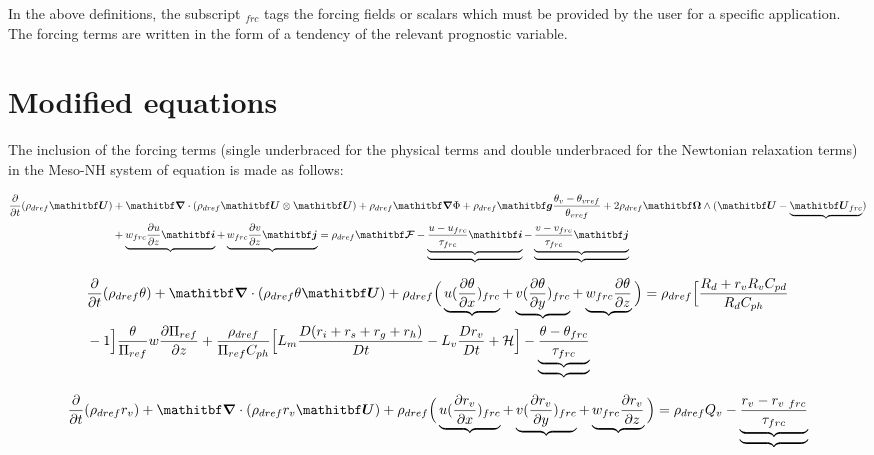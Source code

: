 In the above definitions, the subscript $_{frc}$ tags the forcing fields or scalars
which must be provided by the user for a specific application. The forcing terms
are written in the form of a tendency of the relevant prognostic variable.

\section{Modified equations}
The inclusion of the forcing terms (single underbraced for the physical
terms and double underbraced for the Newtonian relaxation terms) in the
Meso-NH system of equation is made as follows:

\bigskip
{}
\begin{eqnarray}
{\partial \over \partial t} (\rho_{dref} \vec U) & +
\vec \nabla \cdot (\rho_{dref} \vec U\otimes \vec U) + \rho_{dref} \vec \nabla \Phi + \rho_{dref} \vec g \dfrac{\theta_v - \theta_{vref}}{\theta_{vref}}+
2\rho_{dref} \vec \Omega \wedge (\vec U - \underbrace{\vec U_{frc}})
\nonumber \\
 &+ \underbrace{w_{frc} \dfrac{\partial u}{\partial z} \vec i}
  + \underbrace{w_{frc} \dfrac{\partial v}{\partial z} \vec j}
  = \rho_{dref} \vec {\cal F}
- \underbrace{\underbrace{\dfrac{u - u_{frc}}{\tau_{frc}} \vec i}}
- \underbrace{\underbrace{\dfrac{v - v_{frc}}{\tau_{frc}} \vec j}}
\end{eqnarray}

\begin{eqnarray}\label{eqfrc1}
&\dfrac{\partial }{\partial t} (\rho_{dref} \theta)
+ \vec \nabla \cdot  (\rho_{dref} \theta \vec U)+ \rho_{dref} \Big(
  \underbrace{u (\dfrac{\partial \theta }{ \partial x})_{frc}}
+ \underbrace{v (\dfrac{\partial \theta }{ \partial y})_{frc}}
+ \underbrace{w_{frc} \dfrac{\partial \theta }{\partial z}}
\Big) =  \rho_{dref} \Big[ \dfrac{R_d + r_v R_v C_{pd}} {R_d    C_{ph}}
\nonumber \\
& -1 \Big]
 \dfrac{
\theta} {\Pi_{ref}} w \dfrac{\partial \Pi_{ref}} {\partial z}
 + \dfrac{\rho_{dref}} {\Pi_{ref} C_{ph}} \Big[ L_m
\dfrac{D(r_i + r_s + r_g + r_h)} {Dt} - L_v \dfrac{Dr_v} {Dt} + \cal H \Big]
- \underbrace{\underbrace{\dfrac{\theta - \theta_{frc}} {\tau_{frc}}}}
\end{eqnarray}

\begin{equation}
{\partial \over \partial t}(\rho_{dref} r_{v}) + \vec \nabla \cdot
(\rho_{dref} r_{v} \vec U)+ \rho_{dref} \Big(
  \underbrace{u (\dfrac{\partial r_{v} }{ \partial x})_{frc}}
+ \underbrace{v (\dfrac{\partial r_{v} }{ \partial y})_{frc}}
+ \underbrace{w_{frc} \dfrac{\partial r_{v} }{\partial z}}
\Big) = \rho_{dref} Q_{v}
- \underbrace{\underbrace{\dfrac{r_{v}-r_{v\ frc}}{\tau_{frc}}}}
\end{equation}

